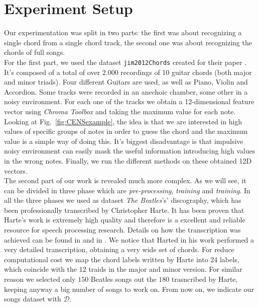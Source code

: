 \section{Experiment Setup}
\label{sec:setup}

Our experimentation was split in two parts: the first was about recognizing a single chord from a single chord track, the second one was about recognizing the chords of full songs.\\
%
For the first part, we used the dataset \texttt{jim2012Chords} \cite{jim2012Chords} created for their paper \cite{JimChordsPaper}. It's composed of a total of over $2.000$ recordings of 10 guitar chords (both major and minor triads). Four different Guitars are used, as well as Piano, Violin and Accordion. Some tracks were recorded in an anechoic chamber, some other in a noisy environment. For each one of the tracks we obtain a 12-dimensional feature vector using \textit{Chroma Toolbox} and taking the maximum value for each note. Looking at Fig.~\ref{fig:CENSexample}, the idea is that we are interested in high values of specific groups of notes in order to guess the chord and the maximum value is a simple way of doing this. It's biggest disadvantage is that impulsive noisy environment can easily mask the useful information introducing high values in the wrong notes. Finally, we run the different methods on these obtained 12D vectors.\\
%
The second part of our work is revealed much more complex. As we will see, it can be divided in three phase which are \textit{pre-processing}, \textit{training} and \textit{training}. In all the three phases we used as dataset \textit{The Beatles}'s' discography, which has been professionally transcribed by Christopher Harte. It has been proven that Harte's work is extremely high quality and therefore is a excellent and reliable resource for speech processing research. Details on how the transcription was achieved can be found in \cite{HartePaper} and in \cite{HarteThesis}. We notice that Harted in his work performed a very detailed transcription, obtaining a very wide set of chords. For reduce computational cost we map the chord labels written by Harte into $24$ labels, which coincide with the $12$ traids in the major and minor version. For similar reason we selected only $150$ Beatles songs out the $180$ trasncribed by Harte, keeping anyway a big number of songs to work on. From now on, we indicate our songs dataset with $\mathcal{D}$. \\
%
